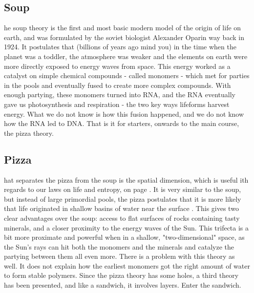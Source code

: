 \subsection{Soup}
he soup theory is the first and most basic modern model of the origin of life on earth, and was formulated by the soviet biologist Alexander Oparin way back in 1924.
It postulates \cite{shapiro} that (billions of years ago mind you) in the time when the planet was a toddler, the atmosphere was weaker and the elements on earth were more directly exposed to energy waves from space.
This energy worked as a catalyst on simple chemical compounds - called monomers - which met for parties in the pools and eventually fused to create more complex compounds.
With enough partying, these monomers turned into RNA, and the RNA eventually gave us photosynthesis and respiration - the two key ways lifeforms harvest energy.
What we do not know is how this fusion happened, and we do not know how the RNA led to DNA. 
That is it for starters, onwards to the main course, the pizza theory.

\subsection{Pizza}
hat separates the pizza from the soup is the spatial dimension, which is useful ith regards to our laws on life and entropy, on page \pageref{entropylol}.
It is very similar to the soup, but instead of large primordial pools, the pizza postulates that it is more likely that life originated in shallow basins of water near the surface \cite{Exoboken}. 
This gives two clear advantages over the soup: access to flat surfaces of rocks containing tasty minerals, and a closer proximity to the energy waves of the Sun.
This trifecta is a bit more proximate and powerful when in a shallow, "two-dimensional" space, as the Sun’s rays can hit both the monomers and the minerals and catalyze the partying between them all even more.
There is a problem with this theory as well.
It does not explain how the earliest monomers got the right amount of water to form stable polymers.
Since the pizza theory has some holes, a third theory has been presented, and like a sandwich, it involves layers.
Enter the sandwich.

